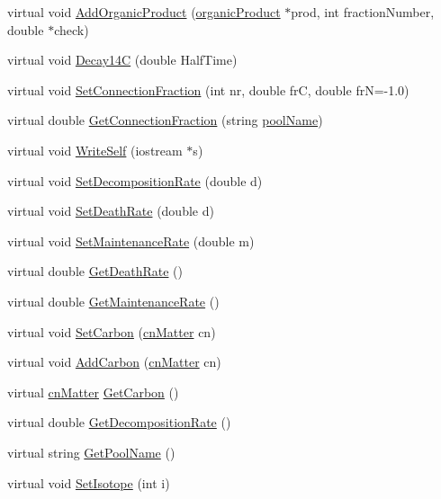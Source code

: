 \begin{DoxyCompactItemize}
\item 
virtual void \hyperlink{classmatter_a7c9d44152352900088849c198d6495ce}{AddOrganicProduct} (\hyperlink{classorganic_product}{organicProduct} $\ast$prod, int fractionNumber, double $\ast$check)
\item 
virtual void \hyperlink{classmatter_aa5d1ab3edc35b1ade3f0714af81e3ab1}{Decay14C} (double HalfTime)
\item 
virtual void \hyperlink{classmatter_a3ef43a1976efeced60e639fb1ec6579a}{SetConnectionFraction} (int nr, double frC, double frN=-\/1.0)
\item 
virtual double \hyperlink{classmatter_a97573040212b5ac7047a2cba344346d1}{GetConnectionFraction} (string \hyperlink{classmatter_aa5a52c9da8fc5f18e214c66c92bf3759}{poolName})
\item 
virtual void \hyperlink{classmatter_a69825448805e58acc5418362a11eac2b}{WriteSelf} (iostream $\ast$s)
\item 
virtual void \hyperlink{classmatter_aea177bcb159721bb1d4fe4bc8b5ec451}{SetDecompositionRate} (double d)
\item 
virtual void \hyperlink{classmatter_a2969cf8d4330d010ce8b2d7c9f989364}{SetDeathRate} (double d)
\item 
virtual void \hyperlink{classmatter_aa6ecf5e0a7bf435208005c087e2f5afa}{SetMaintenanceRate} (double m)
\item 
virtual double \hyperlink{classmatter_a3abae42a1209403e4c6b31521cb4a847}{GetDeathRate} ()
\item 
virtual double \hyperlink{classmatter_addcaacf93fd6c24eceada787a2bac3fe}{GetMaintenanceRate} ()
\item 
virtual void \hyperlink{classmatter_a6ede9887bd438658b4833d1242d8e2a7}{SetCarbon} (\hyperlink{classcn_matter}{cnMatter} cn)
\item 
virtual void \hyperlink{classmatter_a76a28967ecac20950fef8b4a875c0eaa}{AddCarbon} (\hyperlink{classcn_matter}{cnMatter} cn)
\item 
virtual \hyperlink{classcn_matter}{cnMatter} \hyperlink{classmatter_ae85f8f64ea546c5cbe056c641304b514}{GetCarbon} ()
\item 
virtual double \hyperlink{classmatter_abf19fbb793ab04234294f9afca07a337}{GetDecompositionRate} ()
\item 
virtual string \hyperlink{classmatter_ac2484214a3aecdc577de7dab86f0e48b}{GetPoolName} ()
\item 
virtual void \hyperlink{classmatter_a56ffe81f49ab5d79f47cc71ece13a48a}{SetIsotope} (int i)
\item 

\end{DoxyCompactItemize}
